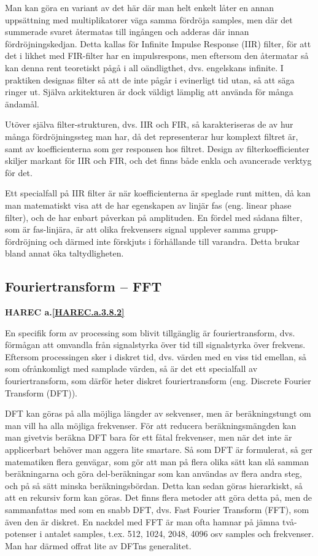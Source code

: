 Man kan göra en variant av det här där man helt enkelt låter en annan
uppsättning med multiplikatorer väga samma fördröja samples, men där det
summerade svaret återmatas till ingången och adderas där innan
fördröjningskedjan.
Detta kallas för Infinite Impulse Response (IIR) filter, för att det i likhet
med FIR-filter har en impulsrespons, men eftersom den återmatar så kan denna
rent teoretiskt pågå i all oändligthet, dvs. engelskans infinite.
I praktiken designas filter så att de inte pågår i evinerligt tid utan, så att
säga ringer ut.
Själva arkitekturen är dock väldigt lämplig att använda för många ändamål.

Utöver själva filter-strukturen, dvs. IIR och FIR, så karakteriseras de av hur
många fördröjningssteg man har, då det representerar hur komplext filtret är,
samt av koefficienterna som ger responsen hos filtret.
Design av filterkoefficienter skiljer markant för IIR och FIR, och det finns
både enkla och avancerade verktyg för det.

Ett specialfall på IIR filter är när koefficienterna är speglade runt mitten,
då kan man matematiskt visa att de har egenskapen av linjär fas (eng. linear
phase filter), och de har enbart påverkan på amplituden.
En fördel med sådana filter, som är fas-linjära, är att olika frekvensers
signal upplever samma grupp-fördröjning och därmed inte förskjuts i förhållande
till varandra.
Detta brukar bland annat öka taltydligheten.

\subsection{Fouriertransform -- FFT}
\textbf{HAREC a.\ref{HAREC.a.3.8.2}\label{myHAREC.a.3.8.2}}

En specifik form av processing som blivit tillgänglig är fouriertransform,
dvs. förmågan att omvandla från signalstyrka över tid till signalstyrka över
frekvens.
Eftersom processingen sker i diskret tid, dvs. värden med en viss tid emellan,
så som ofrånkomligt med samplade värden, så är det ett specialfall av
fouriertransform, som därför heter diskret fouriertransform (eng.
Discrete Fourier Transform (DFT)).

DFT kan göras på alla möjliga längder av sekvenser, men är beräkningstungt
om man vill ha alla möjliga frekvenser.
För att reducera beräkningsmängden kan man givetvis beräkna DFT bara för ett
fåtal frekvenser, men när det inte är applicerbart behöver man aggera lite
smartare.
Så som DFT är formulerat, så ger matematiken flera genvägar, som gör att man
på flera olika sätt kan slå samman beräkningarna och göra del-beräkningar som
kan användas av flera andra steg, och på så sätt minska beräkningsbördan.
Detta kan sedan göras hierarkiskt, så att en rekursiv form kan göras.
Det finns flera metoder att göra detta på, men de sammanfattas med som en
snabb DFT, dvs. Fast Fourier Transform (FFT), som även den är diskret.
En nackdel med FFT är man ofta hamnar på jämna två-potenser i antalet samples,
t.ex. 512, 1024, 2048, 4096 osv samples och frekvenser.
Man har därmed offrat lite av DFTns generalitet.

